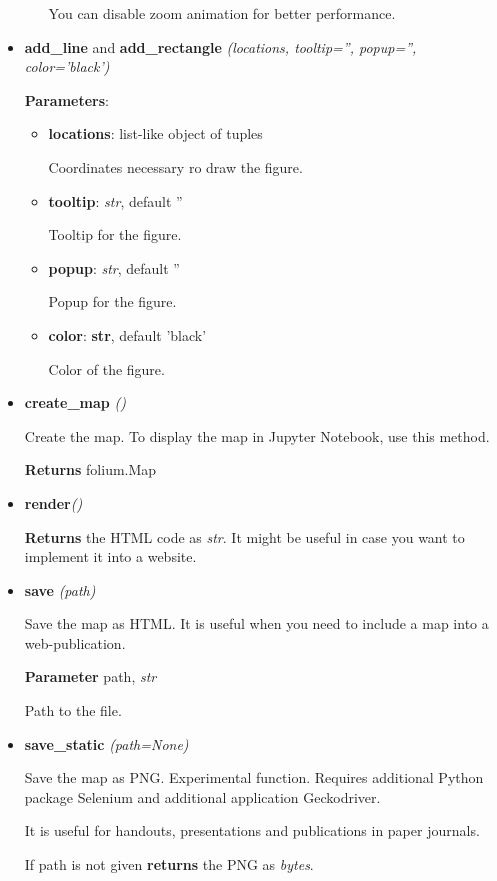 \documentclass[a4paper,12pt]{article}
\begin{document}
\begin{itemize}
\begin{itemize}
  You can disable zoom animation for better performance.
 
 \end{itemize}
 
 \item \textbf{add\_line} and \textbf{add\_rectangle} \textit{(locations, tooltip='', popup='', color='black')}
 
 \textbf{Parameters}:
 \begin{itemize}
  \item \textbf{locations}: list-like object of tuples
  
  Coordinates necessary ro draw the figure.
  
  \item \textbf{tooltip}: \textit{str}, default ''
  
  Tooltip for the figure.
  
  \item \textbf{popup}: \textit{str}, default ''
  
  Popup for the figure.
  
  \item \textbf{color}: \textbf{str}, default 'black'
  
  Color of the figure.
  
 \end{itemize}

 
 \item \textbf{create\_map} \textit{()}
 
 Create the map. To display the map in Jupyter Notebook, use this method.
 
 \textbf{Returns} folium.Map
 
 \item \textbf{render}\textit{()}
 
 \textbf{Returns} the HTML code as \textit{str}. It might be useful in case you want to implement it into a website.
 
 \item \textbf{save} \textit{(path)}
 
 Save the map as HTML. It is useful when you need to include a map into a web-publication.
 
 \textbf{Parameter} path, \textit{str}
 
 Path to the file.
 
 \item \textbf{save\_static} \textit{(path=None)}
 
 Save the map as PNG. Experimental function. Requires additional Python package Selenium and additional application Geckodriver.
 
 It is useful for handouts, presentations and publications in paper journals.
 
 If path is not given \textbf{returns} the PNG as \textit{bytes}.

\end{itemize}
\end{document}
